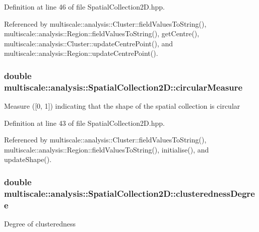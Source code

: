 Definition at line 46 of file Spatial\-Collection2\-D.\-hpp.



Referenced by multiscale\-::analysis\-::\-Cluster\-::field\-Values\-To\-String(), multiscale\-::analysis\-::\-Region\-::field\-Values\-To\-String(), get\-Centre(), multiscale\-::analysis\-::\-Cluster\-::update\-Centre\-Point(), and multiscale\-::analysis\-::\-Region\-::update\-Centre\-Point().

\hypertarget{classmultiscale_1_1analysis_1_1SpatialCollection2D_a4c58c82dd3d67d670b554bfaeb2b19ba}{
\subsubsection[{circular\-Measure}]{\setlength{\rightskip}{0pt plus 5cm}double multiscale\-::analysis\-::\-Spatial\-Collection2\-D\-::circular\-Measure\hspace{0.3cm}{\ttfamily [protected]}}}\label{classmultiscale_1_1analysis_1_1SpatialCollection2D_a4c58c82dd3d67d670b554bfaeb2b19ba}
Measure (\mbox{[}0, 1\mbox{]}) indicating that the shape of the spatial collection is circular 

Definition at line 43 of file Spatial\-Collection2\-D.\-hpp.



Referenced by multiscale\-::analysis\-::\-Cluster\-::field\-Values\-To\-String(), multiscale\-::analysis\-::\-Region\-::field\-Values\-To\-String(), initialise(), and update\-Shape().

\hypertarget{classmultiscale_1_1analysis_1_1SpatialCollection2D_acd11d0bbeb60a1168bd2c2fbbc6fe965}{
\subsubsection[{clusteredness\-Degree}]{\setlength{\rightskip}{0pt plus 5cm}double multiscale\-::analysis\-::\-Spatial\-Collection2\-D\-::clusteredness\-Degree\hspace{0.3cm}{\ttfamily [protected]}}}\label{classmultiscale_1_1analysis_1_1SpatialCollection2D_acd11d0bbeb60a1168bd2c2fbbc6fe965}
Degree of clusteredness 

